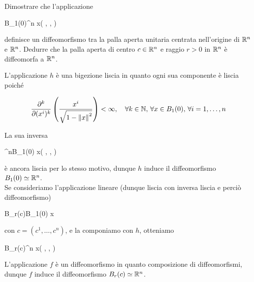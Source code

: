 %

\newpage

%

\section{}\label{es1-4}

\begin{tcolorbox}
	Dimostrare che l'applicazione
	
		{B_{1}(0)}{\R^{n}}
		{x}{\left( , \cdots,  \right)}
	
	definisce un diffeomorfismo tra la palla aperta unitaria centrata nell'origine di $ \mathbb{R}^{n} $ e $ \mathbb{R}^{n} $. Dedurre che la palla aperta di centro $ c \in \mathbb{R}^{n} $ e raggio $ r > 0 $ in $ \mathbb{R}^{n} $ è diffeomorfa a $ \mathbb{R}^{n} $.
\end{tcolorbox}

L'applicazione $ h $ è una bigezione liscia in quanto ogni sua componente è liscia poiché

\begin{equation}
	\pdv[k]{(x^{i})} \left( \dfrac{x^{i}}{\sqrt{ 1-\norm{x}^{2} }} \right) < \infty \qcomma \forall k \in \N, \, \forall x \in B_{1}(0), \, \forall i=1,\dots,n
\end{equation}

La sua inversa

	{\R^{n}}{B_{1}(0)}
	{x}{\left( , \cdots,  \right)}

è ancora liscia per lo stesso motivo, dunque $ h $ induce il diffeomorfismo $ B_{1}(0) \simeq \mathbb{R}^{n} $.\\
Se consideriamo l'applicazione lineare (dunque liscia con inversa liscia e perciò diffeomorfismo)

	{B_{r}(c)}{B_{1}(0)}
	{x}{}

con $ c = (c^{1},\dots,c^{n}) $, e la componiamo con $ h $, otteniamo

	{B_{r}(c)}{\R^{n}}
	{x}{\left( , \cdots,  \right)}

L'applicazione $ f $ è un diffeomorfismo in quanto composizione di diffeomorfismi, dunque $ f $ induce il diffeomorfismo $ B_{r}(c) \simeq \mathbb{R}^{n} $.

